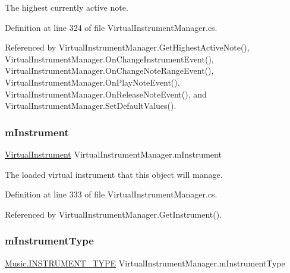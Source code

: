 The highest currently active note. 



Definition at line 324 of file Virtual\+Instrument\+Manager.\+cs.



Referenced by Virtual\+Instrument\+Manager.\+Get\+Highest\+Active\+Note(), Virtual\+Instrument\+Manager.\+On\+Change\+Instrument\+Event(), Virtual\+Instrument\+Manager.\+On\+Change\+Note\+Range\+Event(), Virtual\+Instrument\+Manager.\+On\+Play\+Note\+Event(), Virtual\+Instrument\+Manager.\+On\+Release\+Note\+Event(), and Virtual\+Instrument\+Manager.\+Set\+Default\+Values().

\mbox{\label{group___v_i_m_priv_gaed435d1f9be09864846db4322dc21fd1}} 
\subsubsection{\texorpdfstring{m\+Instrument}{mInstrument}}
{\footnotesize\ttfamily \hyperlink{class_virtual_instrument}{Virtual\+Instrument} Virtual\+Instrument\+Manager.\+m\+Instrument\hspace{0.3cm}{\ttfamily [private]}}



The loaded virtual instrument that this object will manage. 



Definition at line 333 of file Virtual\+Instrument\+Manager.\+cs.



Referenced by Virtual\+Instrument\+Manager.\+Get\+Instrument().

\mbox{\label{group___v_i_m_priv_ga108c350257b3a2080e06cd4a8251f6a4}} 
\subsubsection{\texorpdfstring{m\+Instrument\+Type}{mInstrumentType}}
{\footnotesize\ttfamily \hyperlink{group___music_enums_gabfce60192305965558a36e368ebd67c3}{Music.\+I\+N\+S\+T\+R\+U\+M\+E\+N\+T\+\_\+\+T\+Y\+PE} Virtual\+Instrument\+Manager.\+m\+Instrument\+Type\hspace{0.3cm}{\ttfamily [private]}}



